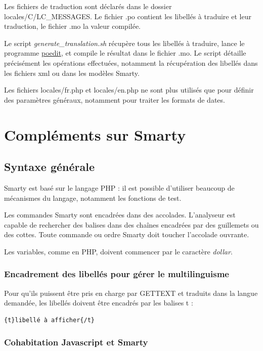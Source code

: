 Les fichiers de traduction sont déclarés dans le dossier locales/C/LC\_MESSAGES. Le fichier .po contient les libellés à traduire et leur traduction, le fichier .mo la valeur compilée.

Le script \textit{generate\_translation.sh} récupère tous les libellés à traduire, lance le programme \href{https://poedit.net/}{poedit}, et compile le résultat dans le fichier .mo. Le script détaille précisément les opérations effectuées, notamment la récupération des libellés dans les fichiers xml ou dans les modèles Smarty.

Les fichiers locales/fr.php et locales/en.php ne sont plus utilisés que pour définir des paramètres généraux, notamment pour traiter les formats de dates.

\chapter{Compléments sur Smarty}\label{smarty}

\section{Syntaxe générale}
Smarty est basé sur le langage PHP : il est possible d'utiliser beaucoup de mécanismes du langage, notamment les fonctions de test.

Les commandes Smarty sont encadrées dans des accolades. L'analyseur est capable de rechercher des balises dans des chaînes encadrées par des guillemets ou des cottes. Toute commande ou ordre Smarty doit toucher l'accolade ouvrante.

Les variables, comme en PHP, doivent commencer par le caractère \textit{dollar}.

\subsection{Encadrement des libellés pour gérer le multilinguisme}

Pour qu'ils puissent être pris en charge par GETTEXT et traduits dans la langue demandée, les libellés doivent être encadrés par les balises t :
\begin{lstlisting}
{t}libellé à afficher{/t}
\end{lstlisting}

\subsection{Cohabitation Javascript et Smarty}


